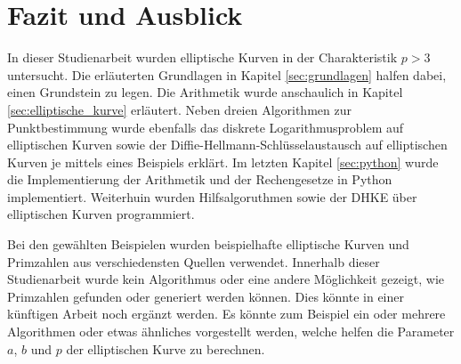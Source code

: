 \chapter{Fazit und Ausblick}
In dieser Studienarbeit wurden elliptische Kurven in der Charakteristik $p > 3$ untersucht. Die erläuterten Grundlagen in Kapitel \ref{sec:grundlagen} halfen dabei, einen Grundstein zu legen. Die Arithmetik wurde anschaulich in Kapitel \ref{sec:elliptische_kurve} erläutert. Neben dreien Algorithmen zur Punktbestimmung wurde ebenfalls das diskrete Logarithmusproblem auf elliptischen Kurven sowie der Diffie-Hellmann-Schlüsselaustausch auf elliptischen Kurven je mittels eines Beispiels erklärt. Im letzten Kapitel \ref{sec:python} wurde die Implementierung der Arithmetik und der Rechengesetze in Python implementiert. Weiterhuin wurden Hilfsalgoruthmen sowie der DHKE über elliptischen Kurven programmiert. 

Bei den gewählten Beispielen wurden beispielhafte elliptische Kurven und Primzahlen aus verschiedensten Quellen verwendet. Innerhalb dieser Studienarbeit wurde kein Algorithmus oder eine andere Möglichkeit gezeigt, wie Primzahlen gefunden oder generiert werden können. Dies könnte in einer künftigen Arbeit noch ergänzt werden. Es könnte zum Beispiel ein oder mehrere Algorithmen oder etwas ähnliches vorgestellt werden, welche helfen die Parameter $a$, $b$ und $p$ der elliptischen Kurve zu berechnen.